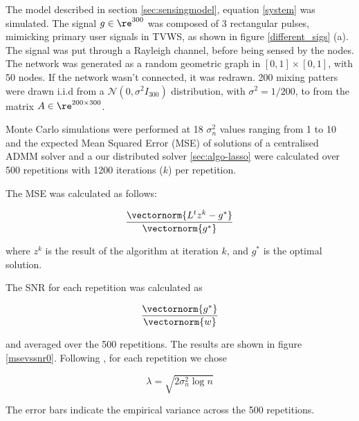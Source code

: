 The model described in section \eqref{sec:sensingmodel}, equation \eqref{system} was simulated. The signal \(g \in \re^{300} \) was composed of 3 rectangular pulses, mimicking primary user signals in TVWS, as shown in figure \eqref{different_sigs} (a). The signal was put through a Rayleigh channel, before being sensed by the nodes. The network was generated as a random geometric graph in \([0,1] \times [0,1]\), with 50 nodes. If the network wasn't connected, it was redrawn. 200 mixing patters were drawn i.i.d from a \(\mathcal{N}\left(0, \sigma^2 I_{300} \right) \) distribution, with \(\sigma^2 = 1/200\), to from the matrix \(A\in  \re^{200 \times 300}\).

Monte Carlo simulations were performed at 18 \(\sigma^2_n\) values ranging from 1 to 10 and the expected Mean Squared Error (MSE) of solutions of a centralised ADMM solver and a our distributed solver \ref{sec:algo-lasso} were calculated over 500 repetitions with 1200 iterations (\(k\)) per repetition.

The MSE was calculated as follows:

\begin{equation}
\frac{\vectornorm{L^tz^k - g^*}}{\vectornorm{g^*}}
\end{equation}

where \(z^k\) is the result of the algorithm at iteration \(k\), and \(g^*\) is the optimal solution.

The SNR for each repetition was calculated as

\begin{equation}
\frac{\vectornorm{g^*}}{\vectornorm{w}}
\end{equation}

and averaged over the 500 repetitions. The results are shown in figure \eqref{msevssnr0}. Following \cite{Chen1998}, for each repetition we chose 

\begin{equation}
\lambda = \sqrt{2\sigma^2_n\log{n}}
\end{equation}

The error bars indicate the empirical variance across the 500 repetitions.

